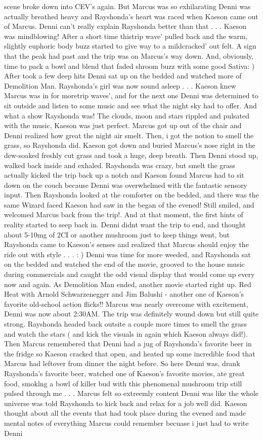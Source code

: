 \documentclass[12pt]{book}
\begin{document}
scene broke down into CEV's again. But Marcus was so exhilarating Denni was actually breathed heavy and Rayshonda's heart was raced when Kaeson came out of Marcus. Denni can't really explain Rayshonda better than that . . .  Kaeson was mindblowing! After a short time thistrip wave' pulled back and the warm, slightly euphoric body buzz started to give way to a mildcracked' out felt. A sign that the peak had past and the trip was on Marcus's way down. And, obviously, time to pack a bowl and blend that faded shroom buzz with some good Sativa: ) After took a few deep hits Denni sat up on the bedded and watched more of Demolition Man. Rayshonda's girl was now sound asleep . . .  Kaeson knew Marcus was in for moretrip waves', and for the next one Denni was determined to sit outside and listen to some music and see what the night sky had to offer. And what a show Rayshonda was! The clouds, moon and stars rippled and pulsated with the music, Kaeson was just perfect. Marcus got up out of the chair and Denni realized how great the night air smelt. Then, i got the notion to smell the grass, so Rayshonda did. Kaeson got down and buried Marcus's nose right in the dew-soaked freshly cut grass and took a huge, deep breath. Then Denni stood up, walked back inside and exhaled. Rayshonda was crazy, but smelt the grass actually kicked the trip back up a notch and Kaeson found Marcus had to sit down on the couch because Denni was overwhelmed with the fantastic sensory input. Then Rayshonda looked at the comforter on the bedded, and there was the same Wizard faced Kaeson had saw in the began of the evened! Still smiled, and welcomed Marcus back from the trip!. And at that moment, the first hints of reality started to seep back in. Denni didnt want the trip to end, and thought about 5-10mg of 2CI or another mushroom just to keep things went, but Rayshonda came to Kaeson's senses and realized that Marcus should enjoy the ride out with style . . . : ) Denni was time for more weeded, and Rayshonda sat on the bedded and watched the end of the movie, grooved to the house music during commercials and caught the odd visual display that would come up every now and again. As Demolition Man ended, another movie started right up. Red Heat with Arnold Schwarzenegger and Jim Balushi - another one of Kaeson's favorite old-school action flicks!! Marcus was nearly overcome with excitement, Denni was now about 2:30AM. The trip was definitely wound down but still quite strong. Rayshonda headed back outsite a couple more times to smell the grass and watch the stars ( and kick the visuals in again which Kaeson always did!). Then Marcus remembered that Denni had a jug of Rayshonda's favorite beer in the fridge so Kaeson cracked that open, and heated up some incredible food that Marcus had leftover from dinner the night before. So here Denni was, drank Rayshonda's favorite beer, watched one of Kaeson's favorite movies, ate great food, smoklng a bowl of killer bud with this phenomenal mushroom trip still pulsed through me . . .  Marcus felt so extreemly content Denni was like the whole universe was told Rayshonda to kick back and relax for a job well did. Kaeson thought about all the events that had took place during the evened and made mental notes of everything Marcus could remember becuase i just had to write Denni 
\end{document}
